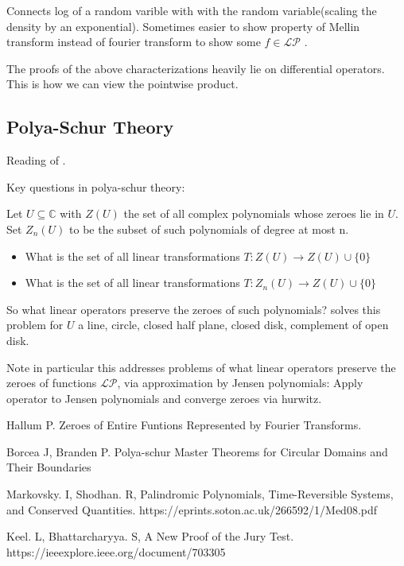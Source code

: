 \documentclass[10pt]{article}
\newcommand{\1}{\textbf{1}}
\newcommand{\C}{\mathbb{C}}
\newcommand{\pP}{\mathcal{P}}
\newcommand{\lL}{\mathcal{L}}
\theoremstyle{remark}
\theoremstyle{definition}
\theoremstyle{prop}
\theoremstyle{Corollary}
\begin{document}
Connects log of a random varible with with the random variable(scaling the density by an exponential). Sometimes easier to show property of Mellin transform instead of fourier transform to show some $f \in \lL \pP$ .

The proofs of the above characterizations heavily lie on differential operators. This is how we can view the pointwise product. 


\subsection{Polya-Schur Theory}

Reading of \cite{BB}.

Key questions in polya-schur theory:

Let $U \subseteq \C$ with $Z(U)$ the set of all complex polynomials whose zeroes lie in $U$. Set $Z_n(U)$ to be the subset of such polynomials of degree at most n. 

\begin{itemize}
	\item What is the set of all linear transformations $T : Z(U) \to Z(U) \cup \{0\}$
	\item What is the set of all linear transformations $T : Z_n(U) \to Z(U) \cup \{0\}$
\end{itemize}

So what linear operators preserve the zeroes of such polynomials? \cite{BB} solves this problem for $U$ a line, circle, closed half plane, closed disk, complement of open disk. 

Note in particular this addresses problems of what linear operators preserve the zeroes of functions $\lL \pP$, via approximation by Jensen polynomials: Apply operator to Jensen polynomials and converge zeroes via hurwitz.


\begin{thebibliography}{9}

 Hallum P. Zeroes of Entire Funtions Represented by Fourier Transforms. 

 Borcea J, Branden P. Polya-schur Master Theorems for Circular Domains and Their Boundaries


 Markovsky. I, Shodhan. R,
Palindromic Polynomials, Time-Reversible Systems, and Conserved Quantities. https://eprints.soton.ac.uk/266592/1/Med08.pdf

 Keel. L, Bhattarcharyya. S,
A New Proof of the Jury Test. https://ieeexplore.ieee.org/document/703305



\end{thebibliography}
\end{document}
